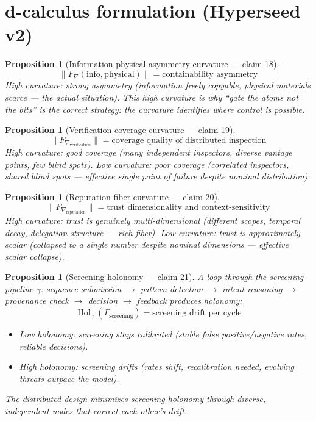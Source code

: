 \documentclass[11pt,a4paper]{article}
\newtheorem{proposition}[definition]{Proposition}
\begin{document}
\section{d-calculus formulation (Hyperseed v2)}

\begin{proposition}[Information-physical asymmetry curvature --- claim 18]
\label{prop:info_phys_curv}
\[
  \|F_\nabla(\text{info}, \text{physical})\| = \text{containability
    asymmetry}
\]
High curvature: strong asymmetry (information freely copyable, physical
materials scarce --- the actual situation). This high curvature is
\emph{why} ``gate the atoms not the bits'' is the correct strategy:
the curvature identifies where control is possible.
\end{proposition}

\begin{proposition}[Verification coverage curvature --- claim 19]
\label{prop:coverage_curv}
\[
  \|F_{\nabla_{\text{verification}}}\| = \text{coverage quality of
    distributed inspection}
\]
High curvature: good coverage (many independent inspectors, diverse
vantage points, few blind spots). Low curvature: poor coverage
(correlated inspectors, shared blind spots --- effective single point
of failure despite nominal distribution).
\end{proposition}

\begin{proposition}[Reputation fiber curvature --- claim 20]
\label{prop:rep_curv}
\[
  \|F_{\nabla_{\text{reputation}}}\| = \text{trust dimensionality
    and context-sensitivity}
\]
High curvature: trust is genuinely multi-dimensional (different scopes,
temporal decay, delegation structure --- rich fiber). Low curvature:
trust is approximately scalar (collapsed to a single number despite
nominal dimensions --- effective scalar collapse).
\end{proposition}

\begin{proposition}[Screening holonomy --- claim 21]
\label{prop:screening_hol}
A loop through the screening pipeline $\gamma$: sequence submission
$\to$ pattern detection $\to$ intent reasoning $\to$ provenance check
$\to$ decision $\to$ feedback produces holonomy:
\[
  \operatorname{Hol}_\gamma(\Gamma_{\text{screening}}) =
    \text{screening drift per cycle}
\]
\begin{itemize}
  \item Low holonomy: screening stays calibrated (stable false
    positive/negative rates, reliable decisions).
  \item High holonomy: screening drifts (rates shift, recalibration
    needed, evolving threats outpace the model).
\end{itemize}
The distributed design minimizes screening holonomy through diverse,
independent nodes that correct each other's drift.
\end{proposition}
\end{document}

